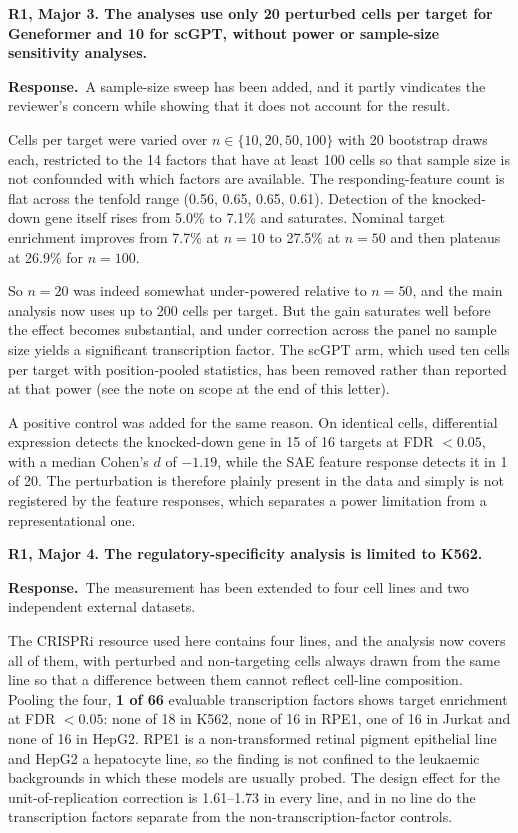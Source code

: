 \documentclass[11pt]{article}
\newcommand{\point}[1]{\vspace{0.7em}\noindent\textbf{#1}\par\vspace{0.15em}}
\newcommand{\reply}{\par\vspace{0.3em}\noindent\textbf{Response.}\ }
\begin{document}
\point{R1, Major 3. The analyses use only 20 perturbed cells per target for Geneformer and 10 for
scGPT, without power or sample-size sensitivity analyses.}
\reply A sample-size sweep has been added, and it partly vindicates the reviewer's concern while showing
that it does not account for the result.

Cells per target were varied over $n \in \{10, 20, 50, 100\}$ with 20 bootstrap draws each,
restricted to the 14 factors that have at least 100 cells so that sample size is not confounded
with which factors are available. The responding-feature count is flat across the tenfold range
(0.56, 0.65, 0.65, 0.61). Detection of the knocked-down gene itself rises from 5.0\% to 7.1\% and
saturates. Nominal target enrichment improves from 7.7\% at $n{=}10$ to 27.5\% at $n{=}50$ and then
plateaus at 26.9\% for $n{=}100$.

So $n{=}20$ was indeed somewhat under-powered relative to $n{=}50$, and the main analysis now uses
up to 200 cells per target. But the gain saturates well before the effect becomes substantial, and
under correction across the panel no sample size yields a significant transcription factor. The
scGPT arm, which used ten cells per target with position-pooled statistics, has been removed rather
than reported at that power (see the note on scope at the end of this letter).

A positive control was added for the same reason. On identical cells, differential expression
detects the knocked-down gene in 15 of 16 targets at FDR $< 0.05$, with a median Cohen's $d$ of
$-1.19$, while the SAE feature response detects it in 1 of 20. The perturbation is therefore
plainly present in the data and simply is not registered by the feature responses, which separates
a power limitation from a representational one.

\point{R1, Major 4. The regulatory-specificity analysis is limited to K562.}
\reply The measurement has been extended to four cell lines and two independent external datasets.

The CRISPRi resource used here contains four lines, and the analysis now covers all of them, with
perturbed and non-targeting cells always drawn from the same line so that a difference between them
cannot reflect cell-line composition. Pooling the four, \textbf{1 of 66} evaluable transcription
factors shows target enrichment at FDR $< 0.05$: none of 18 in K562, none of 16 in RPE1, one of 16
in Jurkat and none of 16 in HepG2. RPE1 is a non-transformed retinal pigment epithelial line and
HepG2 a hepatocyte line, so the finding is not confined to the leukaemic backgrounds in which these
models are usually probed. The design effect for the unit-of-replication correction is 1.61--1.73
in every line, and in no line do the transcription factors separate from the
non-transcription-factor controls.
\end{document}
